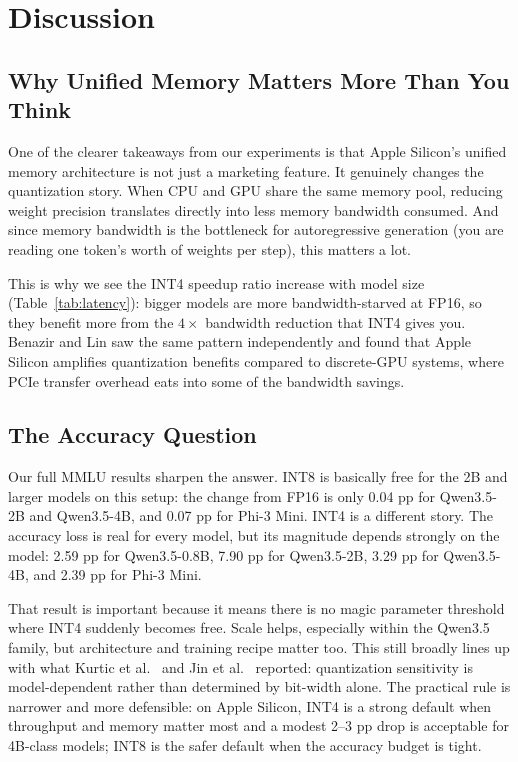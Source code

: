\documentclass[11pt,a4paper]{article}
\begin{document}
\section{Discussion}

\subsection{Why Unified Memory Matters More Than You Think}

One of the clearer takeaways from our experiments is that Apple Silicon's unified memory architecture is not just a marketing feature. It genuinely changes the quantization story. When CPU and GPU share the same memory pool, reducing weight precision translates directly into less memory bandwidth consumed. And since memory bandwidth is the bottleneck for autoregressive generation (you are reading one token's worth of weights per step), this matters a lot.

This is why we see the INT4 speedup ratio increase with model size (Table~\ref{tab:latency}): bigger models are more bandwidth-starved at FP16, so they benefit more from the $4\times$ bandwidth reduction that INT4 gives you. Benazir and Lin \cite{benazir2025profiling} saw the same pattern independently and found that Apple Silicon amplifies quantization benefits compared to discrete-GPU systems, where PCIe transfer overhead eats into some of the bandwidth savings.

\subsection{The Accuracy Question}

Our full MMLU results sharpen the answer. INT8 is basically free for the 2B and larger models on this setup: the change from FP16 is only 0.04 pp for Qwen3.5-2B and Qwen3.5-4B, and 0.07 pp for Phi-3 Mini. INT4 is a different story. The accuracy loss is real for every model, but its magnitude depends strongly on the model: 2.59 pp for Qwen3.5-0.8B, 7.90 pp for Qwen3.5-2B, 3.29 pp for Qwen3.5-4B, and 2.39 pp for Phi-3 Mini.

That result is important because it means there is no magic parameter threshold where INT4 suddenly becomes free. Scale helps, especially within the Qwen3.5 family, but architecture and training recipe matter too. This still broadly lines up with what Kurtic et al.\ \cite{kurtic2024give} and Jin et al.\ \cite{jin2024comprehensive} reported: quantization sensitivity is model-dependent rather than determined by bit-width alone. The practical rule is narrower and more defensible: on Apple Silicon, INT4 is a strong default when throughput and memory matter most and a modest 2--3 pp drop is acceptable for 4B-class models; INT8 is the safer default when the accuracy budget is tight.
\end{document}
